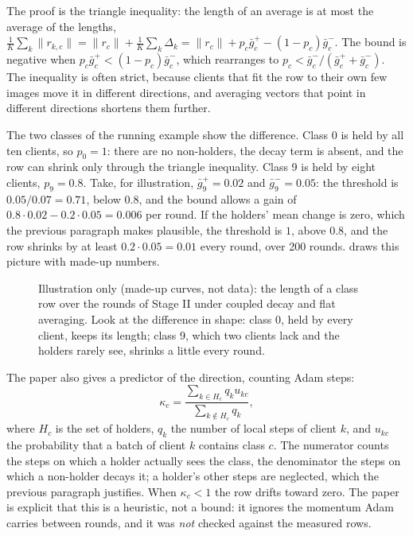 The proof is the triangle inequality: the length of an average is at most the average of the lengths,
$\frac1K\sum_k\|r_{k,c}\|=\|r_c\|+\frac1K\sum_k\Delta_k=\|r_c\|+p_c\bar g^{+}_c-(1-p_c)\bar g^{-}_c$. The bound is negative when
$p_c\bar g^{+}_c<(1-p_c)\bar g^{-}_c$, which rearranges to $p_c<\bar g^{-}_c/(\bar g^{+}_c+\bar g^{-}_c)$. The inequality is often strict,
because clients that fit the row to their own few images move it in different directions, and averaging vectors that
point in different directions shortens them further.

The two classes of the running example show the difference. Class 0 is held by all ten clients, so $p_0=1$: there
are no non-holders, the decay term is absent, and the row can shrink only through the triangle inequality. Class 9 is
held by eight clients, $p_9=0.8$. Take, for illustration, $\bar g^{+}_9=0.02$ and $\bar g^{-}_9=0.05$: the threshold is
$0.05/0.07=0.71$, below $0.8$, and the bound allows a gain of $0.8\cdot0.02-0.2\cdot0.05=0.006$ per round. If the
holders' mean change is zero, which the previous paragraph makes plausible, the threshold is $1$, above $0.8$, and the
row shrinks by at least $0.2\cdot0.05=0.01$ every round, over 200 rounds.  draws this picture with
made-up numbers.

\begin{figure}[t]
\centering
{}
\caption{Illustration only (made-up curves, not data): the length of a class row over the rounds of Stage II under
coupled decay and flat averaging. Look at the difference in shape: class 0, held by every client, keeps its length;
class 9, which two clients lack and the holders rarely see, shrinks a little every round.}
\label{fig:s-shrink}
\end{figure}

The paper also gives a predictor of the direction, counting Adam steps:
\[
\kappa_c=\frac{\sum_{k\in H_c}q_k u_{kc}}{\sum_{k\notin H_c}q_k},
\]
where $H_c$ is the set of holders, $q_k$ the number of local steps of client $k$, and $u_{kc}$ the probability that a
batch of client $k$ contains class $c$. The numerator counts the steps on which a holder actually sees the class, the
denominator the steps on which a non-holder decays it; a holder's other steps are neglected, which the previous
paragraph justifies. When $\kappa_c<1$ the row drifts toward zero. The paper is explicit that this is a heuristic, not
a bound: it ignores the momentum Adam carries between rounds, and it was \emph{not} checked against the measured rows.

